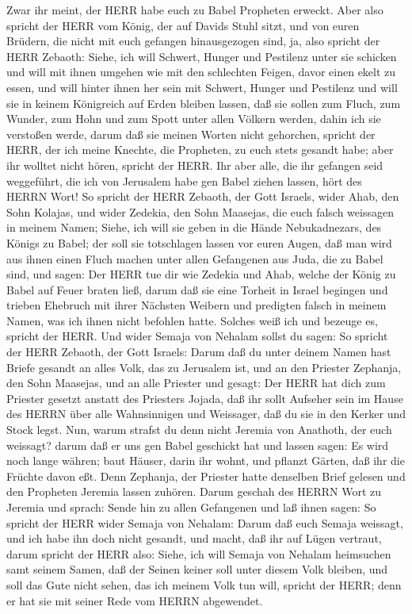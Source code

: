 Zwar ihr meint, der HERR habe euch zu Babel Propheten
erweckt.  Aber also spricht der HERR vom König, der auf
Davids Stuhl sitzt, und von euren Brüdern, die nicht mit euch gefangen
hinausgezogen sind,  ja, also spricht der HERR Zebaoth:
Siehe, ich will Schwert, Hunger und Pestilenz unter sie schicken und
will mit ihnen umgehen wie mit den schlechten Feigen, davor einen ekelt
zu essen,  und will hinter ihnen her sein mit Schwert,
Hunger und Pestilenz und will sie in keinem Königreich auf Erden bleiben
lassen, daß sie sollen zum Fluch, zum Wunder, zum Hohn und zum Spott
unter allen Völkern werden, dahin ich sie verstoßen werde, 
darum daß sie meinen Worten nicht gehorchen, spricht der HERR, der ich
meine Knechte, die Propheten, zu euch stets gesandt habe; aber ihr
wolltet nicht hören, spricht der HERR.  Ihr aber alle, die
ihr gefangen seid weggeführt, die ich von Jerusalem habe gen Babel
ziehen lassen, hört des HERRN Wort!  So spricht der HERR
Zebaoth, der Gott Israels, wider Ahab, den Sohn Kolajas, und wider
Zedekia, den Sohn Maasejas, die euch falsch weissagen in meinem Namen;
Siehe, ich will sie geben in die Hände Nebukadnezars, des Königs zu
Babel; der soll sie totschlagen lassen vor euren Augen, 
daß man wird aus ihnen einen Fluch machen unter allen Gefangenen aus
Juda, die zu Babel sind, und sagen: Der HERR tue dir wie Zedekia und
Ahab, welche der König zu Babel auf Feuer braten ließ, 
darum daß sie eine Torheit in Israel begingen und trieben Ehebruch mit
ihrer Nächsten Weibern und predigten falsch in meinem Namen, was ich
ihnen nicht befohlen hatte. Solches weiß ich und bezeuge es, spricht der
HERR.  Und wider Semaja von Nehalam sollst du sagen:
 So spricht der HERR Zebaoth, der Gott Israels: Darum daß
du unter deinem Namen hast Briefe gesandt an alles Volk, das zu
Jerusalem ist, und an den Priester Zephanja, den Sohn Maasejas, und an
alle Priester und gesagt:  Der HERR hat dich zum Priester
gesetzt anstatt des Priesters Jojada, daß ihr sollt Aufseher sein im
Hause des HERRN über alle Wahnsinnigen und Weissager, daß du sie in den
Kerker und Stock legst.  Nun, warum strafst du denn nicht
Jeremia von Anathoth, der euch weissagt?  darum daß er uns
gen Babel geschickt hat und lassen sagen: Es wird noch lange währen;
baut Häuser, darin ihr wohnt, und pflanzt Gärten, daß ihr die Früchte
davon eßt.  Denn Zephanja, der Priester hatte denselben
Brief gelesen und den Propheten Jeremia lassen zuhören. 
Darum geschah des HERRN Wort zu Jeremia und sprach:  Sende
hin zu allen Gefangenen und laß ihnen sagen: So spricht der HERR wider
Semaja von Nehalam: Darum daß euch Semaja weissagt, und ich habe ihn
doch nicht gesandt, und macht, daß ihr auf Lügen vertraut, 
darum spricht der HERR also: Siehe, ich will Semaja von Nehalam
heimsuchen samt seinem Samen, daß der Seinen keiner soll unter diesem
Volk bleiben, und soll das Gute nicht sehen, das ich meinem Volk tun
will, spricht der HERR; denn er hat sie mit seiner Rede vom HERRN
abgewendet.

